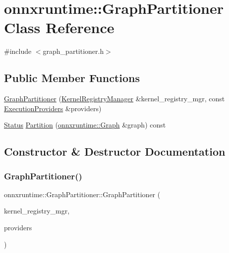 \hypertarget{classonnxruntime_1_1GraphPartitioner}{}\section{onnxruntime\+:\+:Graph\+Partitioner Class Reference}
\label{classonnxruntime_1_1GraphPartitioner}


{\ttfamily \#include $<$graph\+\_\+partitioner.\+h$>$}

\subsection*{Public Member Functions}
\begin{DoxyCompactItemize}
\item 
\mbox{\hyperlink{classonnxruntime_1_1GraphPartitioner_ad825db5cd5dcd3e796887878248751aa}{Graph\+Partitioner}} (\mbox{\hyperlink{classonnxruntime_1_1KernelRegistryManager}{Kernel\+Registry\+Manager}} \&kernel\+\_\+registry\+\_\+mgr, const \mbox{\hyperlink{classonnxruntime_1_1ExecutionProviders}{Execution\+Providers}} \&providers)
\item 
\mbox{\hyperlink{classonnxruntime_1_1common_1_1Status}{Status}} \mbox{\hyperlink{classonnxruntime_1_1GraphPartitioner_a7ac40b366c28fbb83c051f110e40a3ad}{Partition}} (\mbox{\hyperlink{classonnxruntime_1_1Graph}{onnxruntime\+::\+Graph}} \&graph) const
\end{DoxyCompactItemize}


\subsection{Constructor \& Destructor Documentation}
\mbox{\label{classonnxruntime_1_1GraphPartitioner_ad825db5cd5dcd3e796887878248751aa}} 
\subsubsection{\texorpdfstring{Graph\+Partitioner()}{GraphPartitioner()}}
{\footnotesize\ttfamily onnxruntime\+::\+Graph\+Partitioner\+::\+Graph\+Partitioner (\begin{DoxyParamCaption}\item[{\mbox{\hyperlink{classonnxruntime_1_1KernelRegistryManager}{Kernel\+Registry\+Manager}} \&}]{kernel\+\_\+registry\+\_\+mgr,  }\item[{const \mbox{\hyperlink{classonnxruntime_1_1ExecutionProviders}{Execution\+Providers}} \&}]{providers }\end{DoxyParamCaption})\hspace{0.3cm}{\ttfamily [inline]}}



